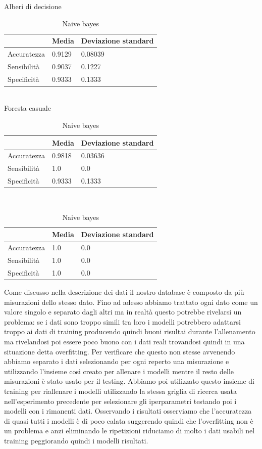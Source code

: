 \documentclass[a4paper,12pt]{report}
\begin{document}
\begin{table}
	\caption{Alberi di decisione}
	\begin{tabular}{|l|l|l|}
	\hline
                & Media     & Deviazione standard	\\ \hline
	Accuratezza & 0.9129	& 0.08039				\\ \hline
    Sensibilità & 0.9037	& 0.1227				\\ \hline
    Specificità & 0.9333	& 0.1333				\\ \hline
	\end{tabular}
	\\


	\caption{Foresta casuale}
	\begin{tabular}{|l|l|l|}
	\hline
                & Media     & Deviazione standard	\\ \hline
	Accuratezza & 0.9818	& 0.03636				\\ \hline
    Sensibilità & 1.0		& 0.0					\\ \hline
    Specificità & 0.9333	& 0.1333				\\ \hline
	\end{tabular}
	\\


	\caption{Naive bayes}
	\begin{tabular}{|l|l|l|}
	\hline
                & Media     & Deviazione standard	\\ \hline
	Accuratezza & 1.0		& 0.0					\\ \hline
    Sensibilità & 1.0		& 0.0					\\ \hline
    Specificità & 1.0		& 0.0					\\ \hline
\end{tabular}
\end{table}



Come discusso nella descrizione dei dati il nostro database è composto da più
misurazioni dello stesso dato. Fino ad adesso abbiamo trattato ogni dato come
un valore singolo e separato dagli altri ma in realtà questo potrebbe rivelarsi
un problema: se i dati sono troppo simili tra loro i modelli potrebbero
adattarsi troppo ai dati di training producendo quindi buoni risultai durante
l'allenamento ma rivelandosi poi essere poco buono con i dati reali trovandosi
quindi in una situazione detta overfitting. Per verificare che questo non stesse
avvenendo abbiamo separato i dati selezionando per ogni reperto una misurazione
e utilizzando l'insieme così creato per allenare i modelli mentre il resto delle
misurazioni è stato usato per il testing. Abbiamo poi utilizzato questo insieme
di training per riallenare i modelli utilizzando la stessa griglia di ricerca
usata nell'esperimento precedente per selezionare gli iperparametri testando poi
i modelli con i rimanenti dati. Osservando i risultati osserviamo che
l'accuratezza di quasi tutti i modelli è di poco calata suggerendo quindi che
l'overfitting non è un problema e anzi eliminando le ripetizioni riduciamo di
molto i dati usabili nel training peggiorando quindi i modelli risultati.
\end{document}
